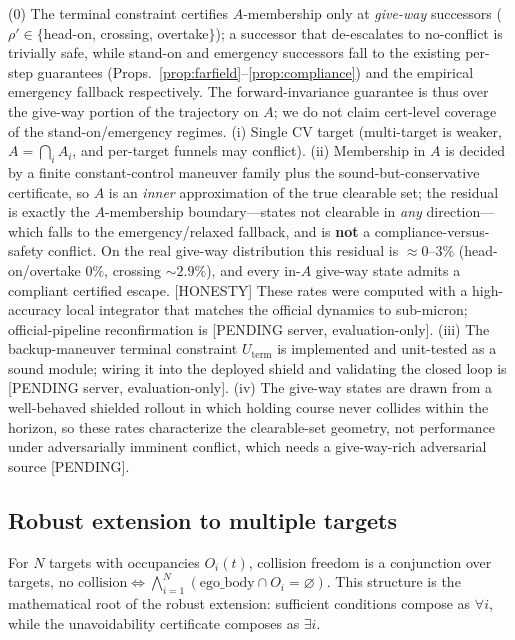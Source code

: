 \begin{scope}
[HONESTY] (0) The terminal constraint certifies $A$-membership only at
\emph{give-way} successors ($\rho'\in\{$head-on, crossing, overtake$\}$); a
successor that de-escalates to no-conflict is trivially safe, while stand-on and
emergency successors fall to the existing per-step guarantees
(Props.~\ref{prop:farfield}--\ref{prop:compliance}) and the empirical emergency
fallback respectively. The forward-invariance guarantee is thus over the give-way
portion of the trajectory on $A$; we do not claim cert-level coverage of the
stand-on/emergency regimes. (i) Single CV target (multi-target is weaker,
$A=\bigcap_i A_i$, and per-target funnels may conflict). (ii) Membership in $A$ is
decided by a finite constant-control maneuver family plus the sound-but-conservative
certificate, so $A$ is an \emph{inner} approximation of the true clearable set; the residual is exactly
the $A$-membership boundary---states not clearable in \emph{any} direction---which
falls to the emergency/relaxed fallback, and is \textbf{not} a
compliance-versus-safety conflict. On the real give-way distribution this residual is
$\approx\!0$--$3\%$ (head-on/overtake $0\%$, crossing $\sim\!2.9\%$), and every
in-$A$ give-way state admits a compliant certified escape. [HONESTY] These rates were
computed with a high-accuracy local integrator that matches the official dynamics to
sub-micron; official-pipeline reconfirmation is [PENDING server, evaluation-only].
(iii) The backup-maneuver terminal constraint $U_{\mathrm{term}}$ is implemented and
unit-tested as a sound module; wiring it into the deployed shield and validating the
closed loop is [PENDING server, evaluation-only]. (iv) The give-way states are drawn
from a well-behaved shielded rollout in which holding course never collides within the
horizon, so these rates characterize the clearable-set geometry, not performance under
adversarially imminent conflict, which needs a give-way-rich adversarial source
[PENDING].
\end{scope}

\subsection{Robust extension to multiple targets}
\label{sec:provable-multi}

For $N$ targets with occupancies $O_i(t)$, collision freedom is a conjunction over
targets, $\text{no collision}\iff\bigwedge_{i=1}^{N}(\text{ego\_body}\cap O_i=\varnothing)$.
This structure is the mathematical root of the robust extension: sufficient
conditions compose as $\forall i$, while the unavoidability certificate composes as
$\exists i$.

